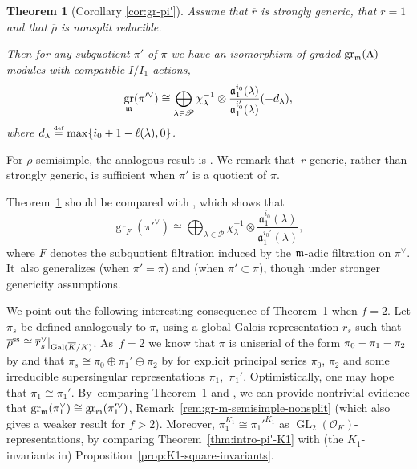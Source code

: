 \documentclass[JEP,XML,SOM,Unicode,NoFloatCountersInSection, NoEqCountersInSection,published]{cedram}
\let\ovl\overline
\newcommand{\defeq}{\stackrel{\textrm{\tiny{\upshape{def}}}}{=}}
\newcommand{\cO}{\mathcal{O}}
\renewcommand{\ss}{\mathrm{ss}}
\newcommand{\fa}{\mathfrak{a}}
\newcommand{\rbar}{\overline{r}}
\newcommand{\rhobar}{\overline{\rho}}
\newcommand{\brho}{\overline{\rho}}
\DeclareMathOperator{\GL}{GL}
\DeclareMathOperator{\gr}{gr}
\theoremstyle{plain}
\newtheorem{thm}[prop]{Theorem}
\theoremstyle{definition}
\begin{document}
\begin{thm}[Corollary \ref{cor:gr-pi'}]\label{thm:intro-gr-pi'}
Assume that $\rbar$ is
\emph{strongly} generic, that $r=1$ and that $\rhobar$ is nonsplit reducible.

Then for any subquotient $\pi'$ of $\pi$ we have an isomorphism of graded $\gr_\m(\Lambda)$-modules with compatible $I/I_1$-actions,\vspace*{-3pt}
\begin{equation}
\label{eq:intro:2}
\gr_\m(\pi'^\vee) \cong \bigoplus_{\lambda\in\mathscr{P}}\chi_{\lambda}^{-1}\otimes \frac{\fa_1^{i_0}(\lambda)}{\fa_1^{i_0'}(\lambda)}(-d_\lambda),
\end{equation}
where $d_\lambda \defeq \max\{i_0+1-\ell(\lambda),0\}$.
\end{thm}

For $\brho$ semisimple, the analogous result is \cite[Cor.\,3.2.7(ii)]{BHHMS4}.
{We remark that~$\rbar$ generic, rather than strongly generic, is sufficient when $\pi'$ is a quotient of $\pi$.}

Theorem~\ref{thm:intro-gr-pi'} should be compared with \cite[Cor.\,4.4.6]{BHHMS4}, which shows that\vspace*{-3pt}
\begin{equation}\label{eq:gr-subquot}
\gr_F(\pi'^\vee) \cong \bigoplus_{\lambda\in\mathscr{P}}\chi_{\lambda}^{-1}\otimes \frac{\mathfrak{a}_1^{i_0}(\lambda)}{\mathfrak{a}_1^{i_0'}(\lambda)},
\end{equation}
where $F$ denotes the subquotient filtration induced by the $\mathfrak{m}$-adic filtration on $\pi^\vee$. It~also generalizes \cite[Th.\,2.1.2]{BHHMS4} (when $\pi' = \pi$) and \cite[Cor.\,4.4.5]{BHHMS4} (when $\pi' \subset \pi$), though under stronger genericity assumptions.

{We point out the following interesting consequence of Theorem~\ref{thm:intro-gr-pi'} when $f = 2$.
Let $\pi_s$ be defined analogously to $\pi$, using a global Galois representation $\rbar_s$ such that $\rhobar^\ss \cong \rbar_s^\vee\vert_{{\rm Gal}(\ovl K/K)}$. As~$f=2$ we know that $\pi$ is uniserial of the form \hbox{$\pi_0 \-- \pi_1 \-- \pi_2$} by \cite[Th.\,10.37]{HuWang2} and that $\pi_s \cong \pi_0 \oplus \pi_1' \oplus \pi_2$ by \cite[Th.\,3.105(ii)]{BHHMS2} for explicit principal series $\pi_0$, $\pi_2$ and some irreducible supersingular representations $\pi_1$,~$\pi_1'$.
Optimistically, one may hope that $\pi_1 \cong \pi_1'$. By~comparing Theorem~\ref{thm:intro-gr-pi'} and \cite[Cor.\,3.2.7(ii)]{BHHMS4}, we can provide nontrivial evidence that $\gr_\m(\pi_1^\vee) \cong \gr_\m(\pi_1'^\vee)$, \cf Remark~\ref{rem:gr-m-semisimple-nonsplit} (which also gives a weaker result for $f > 2$).}
Moreover, $\pi_1^{K_1} \cong \pi_1'^{K_1}$ as $\GL_2(\cO_K)$-representations, by comparing Theorem~\ref{thm:intro-pi'-K1} with (the $K_1$\nobreakdash-invariants in) Proposition~\ref{prop:K1-square-invariants}.
\end{document}
